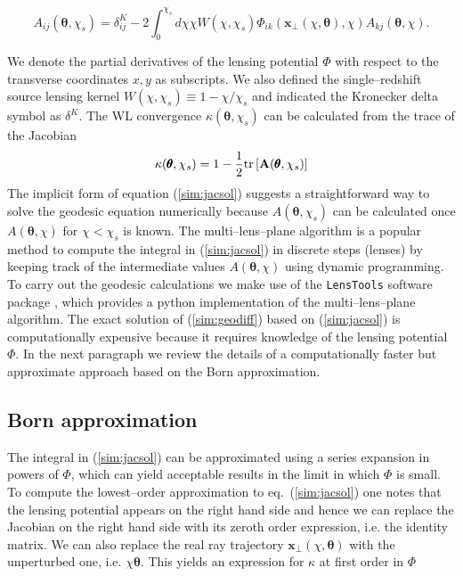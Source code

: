\documentclass[reprint,aps,prd,superscriptaddress,showkeys,showpacs]{revtex4-1}
\newcommand{\bb}[1]{\mathbf{#1}}
\newcommand{\ttt}[1]{\texttt{#1}}
\newcommand\pt{\pmb{\theta}}
\begin{document}
\begin{widetext}
\begin{equation}
\label{sim:jacsol}
A_{ij}(\pt,\chi_s) = \delta^K_{ij}-2\int_0^{\chi_s} d\chi\chi W(\chi,\chi_s)\Phi_{ik}(\bb{x}_\perp(\chi,\pt),\chi)A_{kj}(\pt,\chi).
\end{equation} 
\end{widetext}
%
We denote the partial derivatives of the lensing potential $\Phi$ with respect to the transverse coordinates $x,y$ as subscripts. We also defined the single--redshift source lensing kernel $W(\chi,\chi_s)\equiv 1-\chi/\chi_s$ and indicated the Kronecker delta symbol as $\delta^K$. The WL convergence $\kappa(\pt,\chi_s)$ can be calculated from the trace of the Jacobian
\begin{equation}
\label{sim:trkappa}
\kappa(\pt,\chi_s) = 1-\frac{1}{2}{\rm tr}\left[\bb{A}(\pt,\chi_s)\right]
\end{equation}
%
The implicit form of equation (\ref{sim:jacsol}) suggests a straightforward way to solve the geodesic equation numerically because $A(\pt,\chi_s)$ can be calculated once $A(\pt,\chi)$ for $\chi<\chi_s$ is known. The multi--lens--plane algorithm \citep{RayTracingJain,RayTracingHartlap} is a popular method to compute the integral in (\ref{sim:jacsol}) in discrete steps (lenses) by keeping track of the intermediate values $A(\pt,\chi)$ using dynamic programming. To carry out the geodesic calculations we make use of the \ttt{LensTools} software package \citep{LensTools-paper}, which provides a {\sc python} implementation of the multi--lens--plane algorithm. The exact solution of (\ref{sim:geodiff}) based on (\ref{sim:jacsol}) is computationally expensive because it requires knowledge of the lensing potential $\Phi$. In the next paragraph we review the details of a computationally faster but approximate approach based on the Born approximation.     

\subsection{Born approximation}
The integral in (\ref{sim:jacsol}) can be approximated using a series expansion in powers of $\Phi$, which can yield acceptable results in the limit in which $\Phi$ is small. To compute the lowest--order approximation to eq.~(\ref{sim:jacsol}) one notes that the lensing potential appears on the right hand side and hence we can replace the Jacobian on the right hand side with its zeroth order expression, i.e. the identity matrix. We can also replace the real ray trajectory $\bb{x}_\perp(\chi,\pt)$ with the unperturbed one, i.e. $\chi\pt$. This yields an expression for $\kappa$ at first order in $\Phi$
\end{document}
